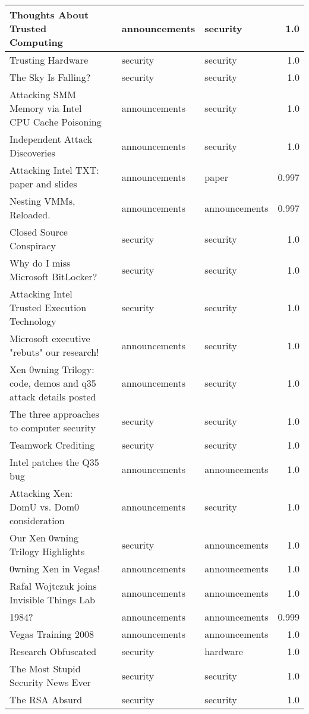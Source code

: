\begin{small}
\begin{longtable}{|p{5cm}|l|l|l|r|}
Thoughts About Trusted Computing&  &announcements&security&1.0\\ \hline 
Trusting Hardware&  &security&security&1.0\\ \hline 
The Sky Is Falling?&  &security&security&1.0\\ \hline 
Attacking SMM Memory via Intel  CPU Cache Poisoning&  &announcements&security&1.0\\ \hline 
Independent Attack Discoveries&  &announcements&security&1.0\\ \hline 
Attacking Intel TXT: paper and slides&  &announcements&paper&0.997\\ \hline 
Nesting VMMs, Reloaded.&  &announcements&announcements&0.997\\ \hline 
Closed Source Conspiracy&  &security&security&1.0\\ \hline 
Why do I miss Microsoft BitLocker?&  &security&security&1.0\\ \hline 
Attacking Intel Trusted Execution Technology&  &security&security&1.0\\ \hline 
Microsoft executive "rebuts" our research!&  &announcements&security&1.0\\ \hline 
Xen 0wning Trilogy: code, demos and q35 attack details posted&  &announcements&security&1.0\\ \hline 
The three approaches to computer security&  &security&security&1.0\\ \hline 
Teamwork Crediting&  &security&security&1.0\\ \hline 
Intel patches the Q35 bug&  &announcements&announcements&1.0\\ \hline 
Attacking Xen: DomU vs. Dom0 consideration&  &announcements&security&1.0\\ \hline 
Our Xen 0wning Trilogy Highlights&  &security&announcements&1.0\\ \hline 
0wning Xen in Vegas!&  &announcements&announcements&1.0\\ \hline 
Rafal Wojtczuk joins Invisible Things Lab&  &announcements&announcements&1.0\\ \hline 
1984?&  &announcements&announcements&0.999\\ \hline 
Vegas Training 2008&  &announcements&announcements&1.0\\ \hline 
Research Obfuscated&  &security&hardware&1.0\\ \hline 
The Most Stupid Security News Ever&  &security&security&1.0\\ \hline 
The RSA Absurd&  &security&security&1.0\\ \hline 

\end{longtable}
\end{small}
